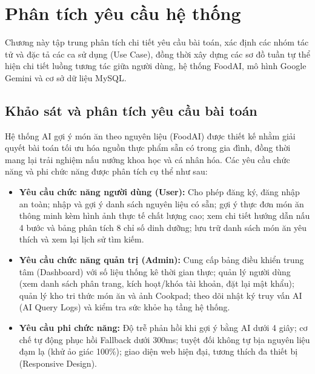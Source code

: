 \chapter{Phân tích yêu cầu hệ thống}
\label{ch:phantich}

\begin{muctieu}
Chương này tập trung phân tích chi tiết yêu cầu bài toán, xác định các nhóm tác tử và đặc tả các ca sử dụng (Use Case), đồng thời xây dựng các sơ đồ tuần tự thể hiện chi tiết luồng tương tác giữa người dùng, hệ thống FoodAI, mô hình Google Gemini và cơ sở dữ liệu MySQL.
\end{muctieu}

\section{Khảo sát và phân tích yêu cầu bài toán}

Hệ thống AI gợi ý món ăn theo nguyên liệu (FoodAI) được thiết kế nhằm giải quyết bài toán tối ưu hóa nguồn thực phẩm sẵn có trong gia đình, đồng thời mang lại trải nghiệm nấu nướng khoa học và cá nhân hóa. Các yêu cầu chức năng và phi chức năng được phân tích cụ thể như sau:
\begin{itemize}[leftmargin=1.6em, itemsep=2pt]
  \item \textbf{Yêu cầu chức năng người dùng (User):} Cho phép đăng ký, đăng nhập an toàn; nhập và gợi ý danh sách nguyên liệu có sẵn; gợi ý thực đơn món ăn thông minh kèm hình ảnh thực tế chất lượng cao; xem chi tiết hướng dẫn nấu 4 bước và bảng phân tích 8 chỉ số dinh dưỡng; lưu trữ danh sách món ăn yêu thích và xem lại lịch sử tìm kiếm.
  \item \textbf{Yêu cầu chức năng quản trị (Admin):} Cung cấp bảng điều khiển trung tâm (Dashboard) với số liệu thống kê thời gian thực; quản lý người dùng (xem danh sách phân trang, kích hoạt/khóa tài khoản, đặt lại mật khẩu); quản lý kho tri thức món ăn và ảnh Cookpad; theo dõi nhật ký truy vấn AI (AI Query Logs) và kiểm tra sức khỏe hạ tầng hệ thống.
  \item \textbf{Yêu cầu phi chức năng:} Độ trễ phản hồi khi gợi ý bằng AI dưới 4 giây; cơ chế tự động phục hồi Fallback dưới 300ms; tuyệt đối không tự bịa nguyên liệu đạm lạ (khử ảo giác 100\%); giao diện web hiện đại, tương thích đa thiết bị (Responsive Design).
\end{itemize}

